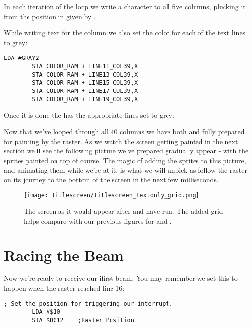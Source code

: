 In each iteration of the loop we write a character to all five columns, plucking it from the position in
 given by . 



While writing text for the column we also set the color for each of the text lines to grey:

\begin{lstlisting}[caption=In \icode{DrawTitleScreenText}]
        LDA #GRAY2
        STA COLOR_RAM + LINE11_COL39,X
        STA COLOR_RAM + LINE13_COL39,X
        STA COLOR_RAM + LINE15_COL39,X
        STA COLOR_RAM + LINE17_COL39,X
        STA COLOR_RAM + LINE19_COL39,X
\end{lstlisting}

Once it is done the  has the appropriate lines set to grey:


Now that we've looped through all 40 columns we have both  and  fully
prepared for painting by the raster. As we watch the screen getting painted in the next section we'll see
the following picture we've prepared gradually appear - with the sprites painted on top of course. The
magic of adding the sprites to this picture, and animating them while we're at it, is what we will
unpick as follow the raster on its journey to the bottom of the screen in the next few milliseconds.

\begin{figure}[H]
    \begin{adjustbox}{width=13cm,center}
    \texttt{[image: titlescreen/titlescreen\_textonly\_grid.png]}%
    \end{adjustbox}
  \caption{The screen as it would appear after  and  have run. The added
  grid helps compare with our previous figures for  and .}
\end{figure}

\section{Racing the Beam}
Now we're ready to receive our ifirst beam. You may remember we set this to happen when the raster reached line 16:

\begin{lstlisting}[caption=In \icode{InitializeSpritesAndInterruptsForTitleScreen}]
        ; Set the position for triggering our interrupt.
        LDA #$10
        STA $D012    ;Raster Position
\end{lstlisting}

